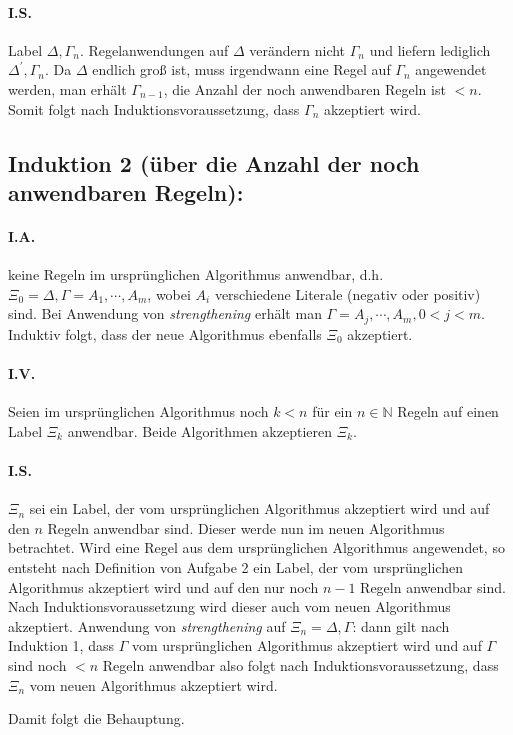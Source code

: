 \paragraph{I.S.} Label $\Delta, \Gamma_n$. Regelanwendungen auf $\Delta$ verändern nicht $\Gamma_n$ und liefern
lediglich $\Delta^\prime, \Gamma_n$. Da $\Delta$ endlich groß ist, muss irgendwann eine Regel auf $\Gamma_n$ angewendet
werden, man erhält $\Gamma_{n-1}$, die Anzahl der noch anwendbaren Regeln ist $< n$. Somit folgt nach
Induktionsvoraussetzung, dass $\Gamma_n$ akzeptiert wird.
\vspace{0.6cm}

\subsection*{Induktion 2 (über die Anzahl der noch anwendbaren Regeln):}
\paragraph{I.A.} keine Regeln im ursprünglichen Algorithmus anwendbar, d.h. $\Xi_0 = \Delta, \Gamma = A_1, \cdots,
A_m$, wobei $A_i$ verschiedene Literale (negativ oder positiv) sind. Bei Anwendung von \emph{strengthening} erhält man
$\Gamma = A_j, \cdots, A_m, 0 < j < m$. Induktiv folgt, dass der neue Algorithmus ebenfalls $\Xi_0$ akzeptiert.

\paragraph{I.V.} Seien im ursprünglichen Algorithmus noch $k < n$ für ein $n \in \mathbb{N}$ Regeln auf einen Label
$\Xi_k$ anwendbar. Beide Algorithmen akzeptieren $\Xi_k$.

\paragraph{I.S.} $\Xi_n$ sei ein Label, der vom ursprünglichen Algorithmus akzeptiert wird und auf den $n$ Regeln
anwendbar sind. Dieser werde nun im neuen Algorithmus betrachtet. Wird eine Regel aus dem ursprünglichen Algorithmus
angewendet, so entsteht nach Definition von Aufgabe 2 ein Label, der vom ursprünglichen Algorithmus akzeptiert wird und
auf den nur noch $n-1$ Regeln anwendbar sind. Nach Induktionsvoraussetzung wird dieser auch vom neuen Algorithmus
akzeptiert. Anwendung von \emph{strengthening} auf $\Xi_n = \Delta, \Gamma$: dann gilt nach Induktion 1, dass $\Gamma$
vom ursprünglichen Algorithmus akzeptiert wird und auf $\Gamma$ sind noch $< n$ Regeln anwendbar also folgt nach
Induktionsvoraussetzung, dass $\Xi_n$ vom neuen Algorithmus akzeptiert wird.

Damit folgt die Behauptung.
